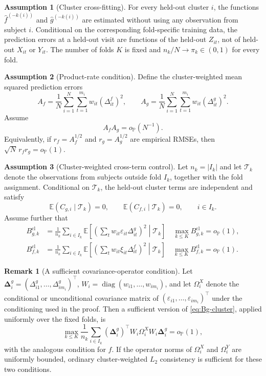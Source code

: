 \documentclass[11pt]{article}
\theoremstyle{definition}
\newtheorem{assumption}{Assumption}[section]
\newtheorem{remark}[theorem]{Remark}
\newcommand{\E}{\mathbb{E}}
\newcommand{\op}{o_{\mathbb{P}}}
\newcommand{\calT}{\mathcal{T}}
\newcommand{\bfDelta}{\boldsymbol{\Delta}}
\begin{document}
\begin{assumption}[Cluster cross-fitting]
\label{ass:crossfit}
For every held-out cluster $i$, the functions
$\widehat f^{(-k(i))}$ and $\widehat g^{(-k(i))}$ are estimated without using any
observation from subject $i$. Conditional on the corresponding fold-specific training data,
the prediction errors at a
held-out visit are functions of the held-out $Z_{it}$, not of held-out $X_{it}$ or $Y_{it}$.
The number of folds $K$ is fixed and $n_k/N\to\pi_k\in(0,1)$ for every fold.
\end{assumption}

\begin{assumption}[Product-rate condition]
\label{ass:product-rate}
Define the cluster-weighted mean squared prediction errors
\[
A_f=\frac1N\sum_{i=1}^N\sum_{t=1}^{m_i}w_{it}(\Delta^f_{it})^2,
\qquad
A_g=\frac1N\sum_{i=1}^N\sum_{t=1}^{m_i}w_{it}(\Delta^g_{it})^2.
\]
Assume
\begin{equation}
A_fA_g=\op(N^{-1}).
\label{eq:product-rate}
\end{equation}
Equivalently, if $r_f=A_f^{1/2}$ and $r_g=A_g^{1/2}$ are empirical RMSEs, then
$\sqrt N\,r_fr_g=\op(1)$.
\end{assumption}

\begin{assumption}[Cluster-weighted cross-term control]
\label{ass:cross-term}
Let $n_k=|I_k|$ and let $\calT_k$ denote the observations from subjects outside fold $I_k$,
together with the fold assignment. Conditional on $\calT_k$, the held-out cluster terms are
independent and satisfy
\[
\E(C_{g,i}\mid\calT_k)=0,
\qquad
\E(C_{f,i}\mid\calT_k)=0,
\qquad i\in I_k.
\]
Assume further that
\begin{align}
B_{g,k}^{\mathrm{cl}}
&=
\frac1{n_k}\sum_{i\in I_k}
\E\left[
\left(\sum_t w_{it}\varepsilon_{it}\Delta^g_{it}\right)^2
\middle|\calT_k
\right]
\quad
\max_{k\leq K}B_{g,k}^{\mathrm{cl}}=\op(1),
\label{eq:Bg-cluster}\\
B_{f,k}^{\mathrm{cl}}
&=
\frac1{n_k}\sum_{i\in I_k}
\E\left[
\left(\sum_t w_{it}\xi_{it}\Delta^f_{it}\right)^2
\middle|\calT_k
\right]
\quad
\max_{k\leq K}B_{f,k}^{\mathrm{cl}}=\op(1).
\label{eq:Bf-cluster}
\end{align}
\end{assumption}

\begin{remark}[A sufficient covariance-operator condition]
Let $\bfDelta_i^g=(\Delta^g_{i1},\ldots,\Delta^g_{im_i})^\top$,
$W_i=\operatorname{diag}(w_{i1},\ldots,w_{im_i})$, and let
$\Omega_i^X$ denote the conditional or unconditional covariance matrix of
$(\varepsilon_{i1},\ldots,\varepsilon_{im_i})^\top$ under the conditioning used in the proof.
Then a sufficient version of \eqref{eq:Bg-cluster}, applied uniformly over the fixed folds, is
\[
\max_{k\leq K}\frac1{n_k}\sum_{i\in I_k}
(\bfDelta_i^g)^\top W_i\Omega_i^XW_i\bfDelta_i^g
=\op(1),
\]
with the analogous condition for $f$. If the operator norms of $\Omega_i^X$ and
$\Omega_i^Y$ are uniformly bounded, ordinary cluster-weighted $L_2$ consistency is sufficient
for these two conditions.
\end{remark}
\end{document}

